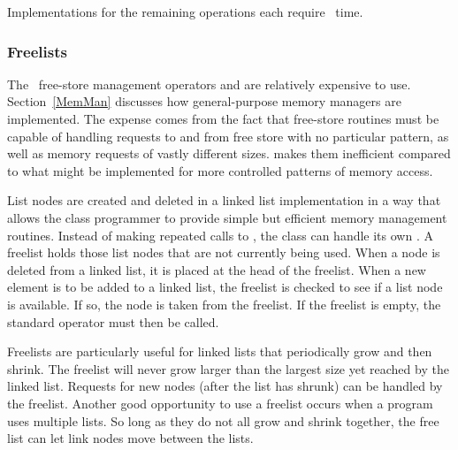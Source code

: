 Implementations for the remaining operations each require
\Thetaone\ time.

\subsubsection{Freelists}
\label{freelist}

The
{\Lang\ free-store management operators
 and  are}{}
relatively expensive to use. 
Section~\ref{MemMan} discusses how general-purpose memory managers
are implemented.
The expense comes from the fact that free-store routines must be
capable of handling requests to and from free store with no particular
pattern, as well as memory requests of vastly different sizes.
makes
them inefficient compared to what might be implemented for more
controlled patterns of memory access.

List nodes are created and deleted in a linked list implementation in
a way that allows the  class programmer
to provide simple but efficient memory management routines.
Instead of making repeated calls to
,
the  class can handle its own .
A freelist holds those list nodes that are not currently being used.
When a node is deleted from a linked list, it is placed at the
head of the free\-list.
When a new element is to be added to a linked list, the freelist
is checked to see if a list node is available.
If so, the node is taken from the freelist.
If the freelist is empty, the standard  operator must then
be called.

Freelists are particularly useful for linked lists that periodically
grow and then shrink.
The freelist will never grow larger than the largest size yet reached
by the linked list.
Requests for new nodes (after the list has shrunk) can be handled by
the freelist.
Another good opportunity to use a freelist occurs when a program uses
multiple lists.
So long as they do not all grow and shrink together, the free list can
let link nodes move between the lists.

